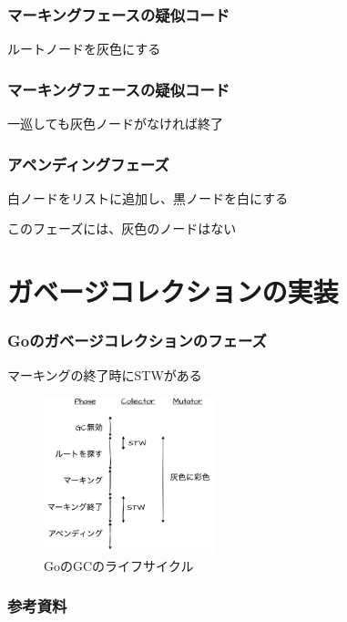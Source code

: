 \documentclass[unicode, 14pt, aspectratio=169]{beamer}
\begin{document}
\begin{frame}
  \frametitle{マーキングフェースの疑似コード}
  {\large ルートノードを灰色にする}
  
\end{frame}
\begin{frame}
  \frametitle{マーキングフェースの疑似コード}
  {\large 一巡しても灰色ノードがなければ終了}
  
\end{frame}
\begin{frame}
  \frametitle{アペンディングフェーズ}
  {\large 白ノードをリストに追加し、黒ノードを白にする}
    
  このフェーズには、灰色のノードはない
\end{frame}
\section{ガベージコレクションの実装}
\begin{frame}
  \frametitle{Goのガベージコレクションのフェーズ}
  {\large マーキングの終了時にSTWがある\supercite{go-gc}}
  \begin{figure}[h]
    \includegraphics[width=5cm]{./img/phase.png}
    \caption{GoのGCのライフサイクル}
    \label{fig:phase}
  \end{figure}
\end{frame}
\begin{frame}[allowframebreaks,t]
  \frametitle{参考資料}
  \printbibliography
  \nocite{*}
\end{frame}
\end{document}
